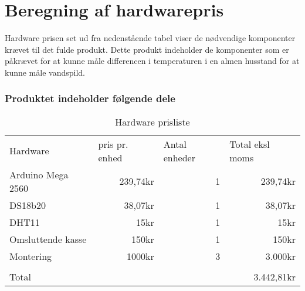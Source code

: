 \section{Beregning af hardwarepris}
Hardware prisen set ud fra nedenstående tabel viser de nødvendige komponenter krævet til det fulde produkt. Dette produkt indeholder de komponenter som er påkrævet for at kunne måle differencen i temperaturen i en almen husstand for at kunne måle vandspild.
\subsubsection{Produktet indeholder følgende dele}  


\begin{table}[h]
\centering
\begin{tabular}{ |p{3cm}||p{3cm}|p{3cm}|p{3cm}|  }
 \hline
 \rowcolor{lightgray}\multicolumn{4}{|c|}{Pris beregning} \\
 \hline
 Hardware    & pris pr. enhed &Antal enheder&Total eksl moms\\
 \hline
 Arduino Mega 2560   & \multicolumn{1}{|r|}{239,74kr}    &\multicolumn{1}{|r|}{1}&   \multicolumn{1}{|r|}{239,74kr}\\
 \hline
 DS18b20&   \multicolumn{1}{|r|}{38,07kr}  & \multicolumn{1}{|r|}{1}   &\multicolumn{1}{|r|}{38,07kr}\\
 \hline
 DHT11 &\multicolumn{1}{|r|}{15kr} & \multicolumn{1}{|r|}{1}&  \multicolumn{1}{|r|}{15kr}\\
 \hline
  Omsluttende kasse\footnotemark  &\multicolumn{1}{|r|}{150kr} & \multicolumn{1}{|r|}{1}&  \multicolumn{1}{|r|}{150kr}\\
 \hline
  Montering &\multicolumn{1}{|r|}{1000kr} & \multicolumn{1}{|r|}{3}&  \multicolumn{1}{|r|}{3.000kr}\\
 \hline
 		&	&	&\\
 \hline
 Total	&	&	&\multicolumn{1}{|r|}{3.442,81kr}\\
 \hline 
\end{tabular}
\caption{Hardware prisliste}
\end{table}

